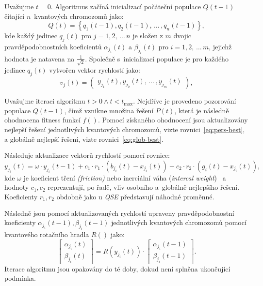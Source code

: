 Uvažujme $t=0$. Algoritmus začíná inicializací počáteční populace $Q\left(t-1\right)$ čítající $n$~kvantových chromozomů jako: 
\begin{equation*}
    Q\left(t\right) = \left\{q_1\left(t-1\right), q_2\left(t-1\right),\,\dots\,,q_n\left(t-1\right)\right\},
\end{equation*}
kde každý jedinec $q_j\left(t\right)$ pro $j=1,2,\,\dots\,n$ je složen z $m$ dvojic pravděpodobnostních koeficientů $\alpha_{j_i}\left(t\right)$ a $\beta_{j_i}\left(t\right)$ pro $i=1,2,\,\dots\,m$, jejichž hodnota je natavena na $\frac{1}{\sqrt{2}}$.
Společně s~inicializací populace je pro každého jedince $q_j\left(t\right)$ vytvořen vektor rychlostí jako:
\begin{equation*}
    v_j\left(t\right) = \begin{pmatrix} y_{j_1}\left(t\right), y_{j_2}\left(t\right),\,\dots\,, y_{j_m}\left(t\right) \end{pmatrix},
\end{equation*}

Uvažujme iteraci algoritmu $t>0 \wedge t<t_{\text{max}}$. 
Nejdříve je provedeno pozorování populace $Q\left(t-1\right)$, čímž vznikne množina řešení $P\left(t\right)$, která je následně ohodnocena fitness funkcí $f\left(\right)$. 
Pomocí získaného ohodnocení jsou aktualizovány nejlepší řešení jednotlivých kvantových chromozomů, vizte rovnici~\ref{eq:pers-best}, a globálně nejlepší řešení, vizte rovnici~\ref{eq:glob-best}. 

Následuje aktualizace vektorů rychlostí pomocí rovnice:
\begin{equation*}
    y_{j_i}\left(t\right) = \omega \cdot y_{j_i}\left(t-1\right) + c_1 \cdot r_1 \cdot (b_{j_i}\left(t\right) - x_{j_i}\left(t\right)) + c_2 \cdot r_2 \cdot (g_i\left(t\right) - x_{j_i}\left(t\right)),
\end{equation*}
kde $\omega$ je koeficient tření \emph{(friction)} nebo inerciální váha (\emph{intercal weight})~\cite{PSO-c1c2w} a hodnoty $c_1,c_2$ reprezentují, po řadě, vliv osobního a~globálně nejlepšího řešení. 
Koeficienty $r_1, r_2$ obdobně jako u \emph{QSE} představují náhodné proměnné. 

Následně jsou pomocí aktualizovaných rychlostí upraveny pravděpodobnostní koeficienty $\alpha_{j_i}\left(t-1\right), \beta_{j_i}\left(t-1\right)$ jednotlivých kvantových chromozomů pomocí kvantového rotačního hradla $R\left(\right)$ jako: 
\begin{equation*}
    \begin{bmatrix}
        \alpha_{j_i}\left(t\right) \\
        \beta_{j_i}\left(t\right)
    \end{bmatrix}
    =
    R\left(y_{j_i}\left(t\right)\right) \cdot
    \begin{bmatrix}
        \alpha_{j_i}\left(t-1\right) \\
        \beta_{j_i}\left(t-1\right) 
    \end{bmatrix}.
\end{equation*}
Iterace algoritmu jsou opakovány do té doby, dokud není splněna ukončující podmínka. 

